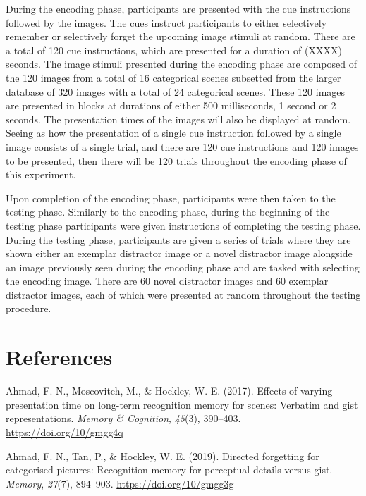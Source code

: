 \documentclass[
  english,
  man,floatsintext]{apa6}
\begin{document}
During the encoding phase, participants are presented with the cue instructions followed by the images. The cues instruct participants to either selectively remember or selectively forget the upcoming image stimuli at random. There are a total of 120 cue instructions, which are presented for a duration of (XXXX) seconds. The image stimuli presented during the encoding phase are composed of the 120 images from a total of 16 categorical scenes subsetted from the larger database of 320 images with a total of 24 categorical scenes. These 120 images are presented in blocks at durations of either 500 milliseconds, 1 second or 2 seconds. The presentation times of the images will also be displayed at random. Seeing as how the presentation of a single cue instruction followed by a single image consists of a single trial, and there are 120 cue instructions and 120 images to be presented, then there will be 120 trials throughout the encoding phase of this experiment.

Upon completion of the encoding phase, participants were then taken to the testing phase. Similarly to the encoding phase, during the beginning of the testing phase participants were given instructions of completing the testing phase. During the testing phase, participants are given a series of trials where they are shown either an exemplar distractor image or a novel distractor image alongside an image previously seen during the encoding phase and are tasked with selecting the encoding image. There are 60 novel distractor images and 60 exemplar distractor images, each of which were presented at random throughout the testing procedure.

\newpage

\hypertarget{references}{%
\section{References}\label{references}}

\begingroup
\setlength{\parindent}{-0.5in}
\setlength{\leftskip}{0.5in}

\hypertarget{refs}{}
\leavevmode\hypertarget{ref-ahmadEffectsVaryingPresentation2017}{}%
Ahmad, F. N., Moscovitch, M., \& Hockley, W. E. (2017). Effects of varying presentation time on long-term recognition memory for scenes: Verbatim and gist representations. \emph{Memory \& Cognition}, \emph{45}(3), 390--403. \url{https://doi.org/10/gmgg4q}

\leavevmode\hypertarget{ref-ahmadDirectedForgettingCategorised2019}{}%
Ahmad, F. N., Tan, P., \& Hockley, W. E. (2019). Directed forgetting for categorised pictures: Recognition memory for perceptual details versus gist. \emph{Memory}, \emph{27}(7), 894--903. \url{https://doi.org/10/gmgg3g}
\end{document}
